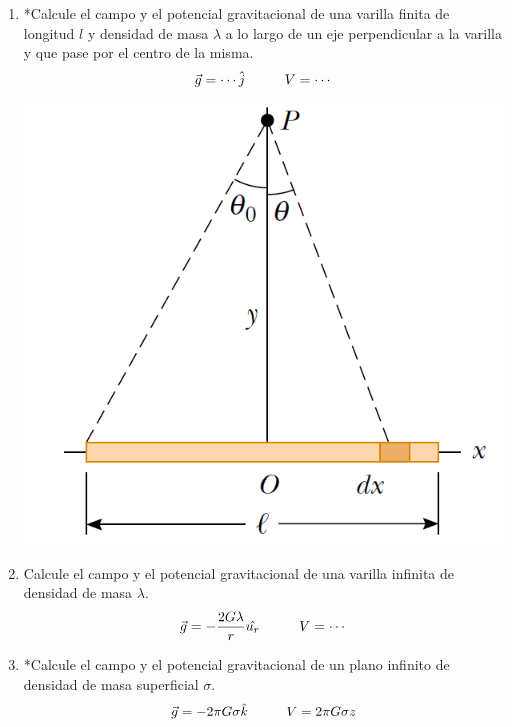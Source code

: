 \documentclass[11pt,twocolumn]{article}
\begin{document}
\begin{enumerate}
\item *Calcule el campo y el potencial gravitacional de una varilla finita de longitud $l$ y densidad de masa $\lambda$ a lo largo de un eje perpendicular a la varilla y que pase por el centro de la misma.
\begin{displaymath}
\vec{g}=\cdots \hat{j} \hspace{1.0 cm} V=\cdots
\end{displaymath}
{
\begin{center}
\includegraphics[scale=0.25]{varilla-finita}
\end{center}
}

\item Calcule el campo y el potencial gravitacional de una varilla infinita de densidad de masa $\lambda$.
\begin{displaymath}
\vec{g}=-\dfrac{2G\lambda}{r}\hat{u_{r}} \hspace{1.0 cm} V=\cdots
\end{displaymath}

\item *Calcule el campo y el potencial gravitacional de un plano infinito de densidad de masa superficial $\sigma$.
\begin{displaymath}
\vec{g}=-2\pi G\sigma \hat{k} \hspace{1.0 cm} V=2\pi G \sigma z
\end{displaymath}


\end{enumerate}
\end{document}

